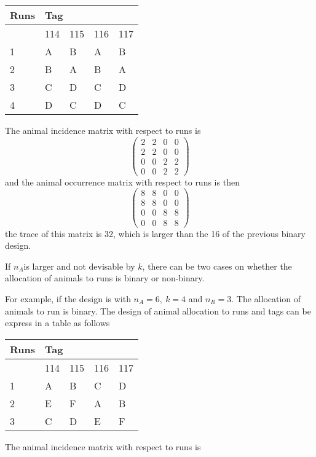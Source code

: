 \begin{tabular}{|p{0.3in}|p{0.3in}|p{0.3in}|p{0.3in}|p{0.3in}|} \hline 
Runs & \multicolumn{4}{|p{1.3in}|}{Tag} \\ \hline 
 & 114 & 115 & 116 & 117 \\ \hline 
1 & A & B & A & B \\ \hline 
2 & B & A & B & A \\ \hline 
3 & C & D & C & D \\ \hline 
4 & D & C & D & C \\ \hline 
\end{tabular}

The animal incidence matrix with respect to runs is
\[\left( \begin{array}{cccc}
2 & 2 & 0 & 0 \\ 
2 & 2 & 0 & 0 \\ 
0 & 0 & 2 & 2 \\ 
0 & 0 & 2 & 2 \end{array}
\right)\] 
and the animal occurrence matrix with respect to runs is then 
\[\left( \begin{array}{cccc}
8 & 8 & 0 & 0 \\ 
8 & 8 & 0 & 0 \\ 
0 & 0 & 8 & 8 \\ 
0 & 0 & 8 & 8 \end{array}
\right)\] 
the trace of this matrix is 32, which is larger than the 16 of the previous binary design.

\noindent If $n_A$is larger and not devisable by $k$, there can be two cases on whether the allocation of animals to runs is binary or non-binary. 

\noindent For example, if the design is with $n_A=6,\ k=4$ and $n_R=3$. The allocation of animals to run is binary. The design of animal allocation to runs and tags can be express in a table as follows

\begin{tabular}{|p{0.3in}|p{0.3in}|p{0.3in}|p{0.3in}|p{0.3in}|} \hline 
Runs & \multicolumn{4}{|p{1.3in}|}{Tag} \\ \hline 
 & 114 & 115 & 116 & 117 \\ \hline 
1 & A & B & C & D \\ \hline 
2 & E & F & A & B \\ \hline 
3 & C & D & E & F \\ \hline 
\end{tabular}

 The animal incidence matrix with respect to runs is   

